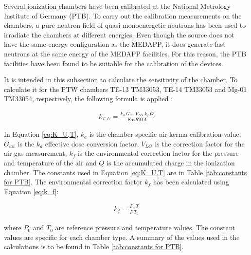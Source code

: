 Several ionization chambers have been calibrated at the National Metrology Institute of Germany (PTB). To carry out the calibration measurements on the chambers, a pure neutron field of quasi monoenergetic neutrons has been used to irradiate the chambers at different energies. Even though the source does not have the same energy configuration as the MEDAPP, it does generate fast neutrons at the same energy of the MEDAPP facilities. For this reason, the PTB facilities have been found to be suitable for the calibration of the devices. 

It is intended in this subsection to calculate the sensitivity of the chamber. To calculate it for the PTW chambers TE-13 TM33053, TE-14 TM33053 and Mg-01 TM33054, respectively, the following formula is applied \cite{ReportPTW2018}:

\begin{align}
\label{eq:K_U,T}
    {k_{T,U} = \frac{k_a \: G_{aw} \: V_{LG} \: k_f \: Q}{KERMA}}
\end{align}

In Equation \ref{eq:K_U,T}, $k_a$ is the chamber specific air kerma calibration value, $G_{aw}$ is the $k_a$ effective dose conversion factor, $V_{LG}$ is the correction factor for the air-gas measurement, $k_f$ is the environmental correction factor for the pressure and temperature of the air and $Q$ is the accumulated charge in the ionization chamber. The constants used in Equation \ref{eq:K_U,T} are in Table \ref{tab:constants for PTB}. The environmental correction factor $k_f$ has been calculated using Equation \ref{eq:k_f}:

\begin{align}
\label{eq:k_f}
    {k_f = \frac{P_0 \: T}{P \: T_0}}
\end{align}

where $P_0$ and $T_0$ are reference pressure and temperature values. The  constant values are specific for each chamber type. A summary of the values used in the calculations is to be found in Table \ref{tab:constants for PTB}.

